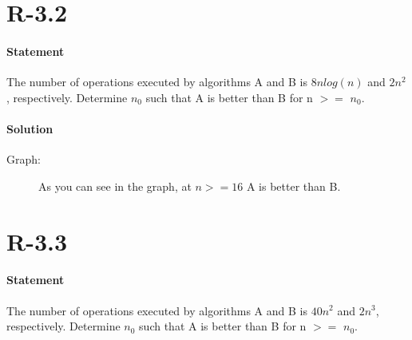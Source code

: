 \documentclass{article}
\begin{document}
\newpage
\section{R-3.2}
\paragraph{Statement}
The number of operations executed by algorithms A and B is $8nlog(n)$ and
$2n^2$, respectively. Determine $n_{0}$ such that A is better than B for n $>=$ $n_{0}$.
\paragraph{Solution}
Graph:
  \begin{figure}[h]
    \begin{center}
    \caption{As you can see in the graph, at $n>=16$ A is better than B.}
    \end{center}
  \end{figure}

\newpage
\section{R-3.3}
\paragraph{Statement}
The number of operations executed by algorithms A and B is $40n^2$ and
$2n^3$, respectively. Determine $n_{0}$ such that A is better than B for n $>=$ $n_{0}$.
\end{document}
